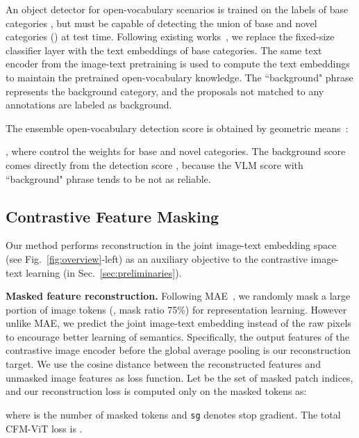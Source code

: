 \documentclass[10pt,twocolumn,letterpaper]{article}
\newcommand{\figref}[1]{Fig.~\ref{#1}}
\newcommand{\secref}[1]{Sec.~\ref{#1}}
\renewcommand{\paragraph}[1]{\vspace{1mm}\noindent\textbf{#1}}
\newcommand{\ours}{CFM-ViT\xspace}
\begin{document}
An object detector for open-vocabulary scenarios is trained on the labels of base categories , but must be capable of detecting the union of base and novel categories () at test time. Following existing works~\cite{Zareian_2021_CVPR,gu2022openvocabulary}, we replace the fixed-size classifier layer with the text embeddings of base categories. The same text encoder from the image-text pretraining is used to compute the text embeddings to maintain the pretrained open-vocabulary knowledge. The ``background" phrase represents the background category, and the proposals not matched to any  annotations are labeled as background. 

The ensemble open-vocabulary detection score  is obtained by geometric means~\cite{gu2022openvocabulary,kuo2022f}:

, where  control the weights for base and novel categories. The background score comes directly from the detection score , because the VLM score with ``background" phrase tends to be not as reliable.


\subsection{Contrastive Feature Masking}
\label{sec:method:pretraining}
Our method performs reconstruction in the joint image-text embedding space (see \figref{fig:overview}-left) as an auxiliary objective to the contrastive image-text learning (in \secref{sec:preliminaries}).



\paragraph{Masked feature reconstruction.}\quad
Following MAE~\cite{he2022masked}, we randomly mask a large portion of image tokens (\eg, mask ratio 75\%) for representation learning. However unlike MAE, we predict the joint image-text embedding instead of the raw pixels to encourage better learning of semantics. Specifically, the output features  of the contrastive image encoder before the global average pooling is our reconstruction target. We use the cosine distance between the reconstructed features  and unmasked image features  as loss function. Let  be the set of masked patch indices, and our reconstruction loss  is computed only on the masked tokens as:

where  is the number of masked tokens and \texttt{sg} denotes stop gradient. The total \ours loss is .
\end{document}
